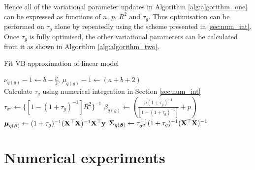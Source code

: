 \documentclass{amsart}[12pt]
\begin{document}
\noindent Hence all of the variational parameter updates in Algorithm \ref{alg:algorithm_one} can be expressed as functions
of $n$, $p$, $R^2$ and $\tau_g$. Thus optimisation can be performed on $\tau_g$ alone by repeatedly using the
scheme presented in \ref{sec:num_int}. Once $\tau_g$ is fully optimised, the other variational parameters can
be calculated from it as shown in Algorithm \ref{alg:algorithm_two}.

\begin{algorithm}
	\caption{Fit VB approximation of linear model}
	\label{alg:algorithm_two}
	\begin{algorithmic}
		\REQUIRE $\nu_{q(g)} - 1 \leftarrow b - \frac{p}{2}$, $\mu_{q(g)} - 1 \leftarrow (a + b + 2)$ \\
		\STATE Calculate $\tau_{g}$ using numerical integration in Section \ref{sec:num_int}
		\ENDWHILE
		\STATE $\tau_{\sigma^2} \leftarrow \{[1 - (1 + \tau_g)^{-1}] R^2\}^{-1}$
		\STATE $\beta_{q(g)} \leftarrow \left(\frac{n (1 + \tau_g)^{-1}}{[1 - (1 + \tau_g)^{-1}]} + p \right)$
		\STATE ${\boldsymbol \mu}_{q({\boldsymbol \beta})} \leftarrow (1 + \tau_g)^{-1} ({\bf X}^\top {\bf X})^{-1} {\bf X}^\top {\bf y}$
		\STATE ${\boldsymbol \Sigma}_{q({\boldsymbol \beta})} \leftarrow \tau_{\sigma^2}^{-1} (1 + \tau_{g})^{-1}({\bf X}^\top {\bf X})^{-1}$
	\end{algorithmic}
\end{algorithm}


\section{Numerical experiments}
\label{sec:num_exp}




\end{document}
